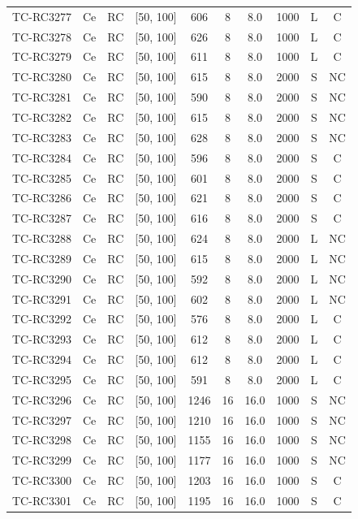 \begin{longtable}{lccccccccc}
TC-RC3277 & Ce & RC & [50, 100] & 606 & 8 & 8.0 & 1000 & L & C \\
TC-RC3278 & Ce & RC & [50, 100] & 626 & 8 & 8.0 & 1000 & L & C \\
TC-RC3279 & Ce & RC & [50, 100] & 611 & 8 & 8.0 & 1000 & L & C \\
TC-RC3280 & Ce & RC & [50, 100] & 615 & 8 & 8.0 & 2000 & S & NC \\
TC-RC3281 & Ce & RC & [50, 100] & 590 & 8 & 8.0 & 2000 & S & NC \\
TC-RC3282 & Ce & RC & [50, 100] & 615 & 8 & 8.0 & 2000 & S & NC \\
TC-RC3283 & Ce & RC & [50, 100] & 628 & 8 & 8.0 & 2000 & S & NC \\
TC-RC3284 & Ce & RC & [50, 100] & 596 & 8 & 8.0 & 2000 & S & C \\
TC-RC3285 & Ce & RC & [50, 100] & 601 & 8 & 8.0 & 2000 & S & C \\
TC-RC3286 & Ce & RC & [50, 100] & 621 & 8 & 8.0 & 2000 & S & C \\
TC-RC3287 & Ce & RC & [50, 100] & 616 & 8 & 8.0 & 2000 & S & C \\
TC-RC3288 & Ce & RC & [50, 100] & 624 & 8 & 8.0 & 2000 & L & NC \\
TC-RC3289 & Ce & RC & [50, 100] & 615 & 8 & 8.0 & 2000 & L & NC \\
TC-RC3290 & Ce & RC & [50, 100] & 592 & 8 & 8.0 & 2000 & L & NC \\
TC-RC3291 & Ce & RC & [50, 100] & 602 & 8 & 8.0 & 2000 & L & NC \\
TC-RC3292 & Ce & RC & [50, 100] & 576 & 8 & 8.0 & 2000 & L & C \\
TC-RC3293 & Ce & RC & [50, 100] & 612 & 8 & 8.0 & 2000 & L & C \\
TC-RC3294 & Ce & RC & [50, 100] & 612 & 8 & 8.0 & 2000 & L & C \\
TC-RC3295 & Ce & RC & [50, 100] & 591 & 8 & 8.0 & 2000 & L & C \\
TC-RC3296 & Ce & RC & [50, 100] & 1246 & 16 & 16.0 & 1000 & S & NC \\
TC-RC3297 & Ce & RC & [50, 100] & 1210 & 16 & 16.0 & 1000 & S & NC \\
TC-RC3298 & Ce & RC & [50, 100] & 1155 & 16 & 16.0 & 1000 & S & NC \\
TC-RC3299 & Ce & RC & [50, 100] & 1177 & 16 & 16.0 & 1000 & S & NC \\
TC-RC3300 & Ce & RC & [50, 100] & 1203 & 16 & 16.0 & 1000 & S & C \\
TC-RC3301 & Ce & RC & [50, 100] & 1195 & 16 & 16.0 & 1000 & S & C \\

\end{longtable}
